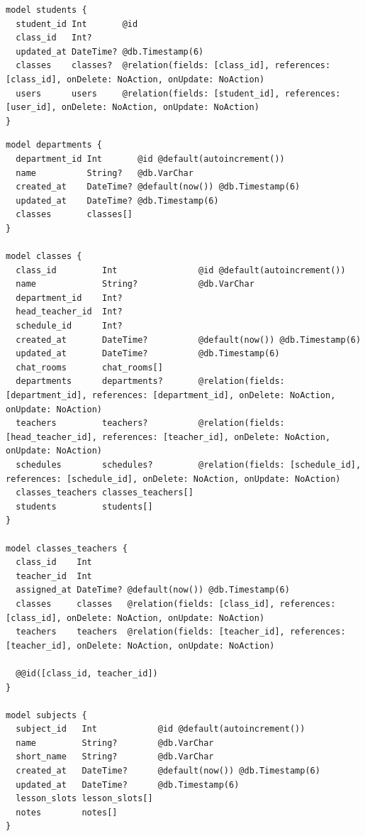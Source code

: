 \begin{listing}[H]
\begin{verbatim}
model students {
  student_id Int       @id
  class_id   Int?
  updated_at DateTime? @db.Timestamp(6)
  classes    classes?  @relation(fields: [class_id], references: [class_id], onDelete: NoAction, onUpdate: NoAction)
  users      users     @relation(fields: [student_id], references: [user_id], onDelete: NoAction, onUpdate: NoAction)
}
\end{verbatim}
\caption{Prisma -- Modell \texttt{users} sowie die spezialisierten Rollen \texttt{teachers} und \texttt{students}}
\label{lst:prisma_users}
\end{listing}

\begin{listing}[H]
\begin{verbatim}
model departments {
  department_id Int       @id @default(autoincrement())
  name          String?   @db.VarChar
  created_at    DateTime? @default(now()) @db.Timestamp(6)
  updated_at    DateTime? @db.Timestamp(6)
  classes       classes[]
}

model classes {
  class_id         Int                @id @default(autoincrement())
  name             String?            @db.VarChar
  department_id    Int?
  head_teacher_id  Int?
  schedule_id      Int?
  created_at       DateTime?          @default(now()) @db.Timestamp(6)
  updated_at       DateTime?          @db.Timestamp(6)
  chat_rooms       chat_rooms[]
  departments      departments?       @relation(fields: [department_id], references: [department_id], onDelete: NoAction, onUpdate: NoAction)
  teachers         teachers?          @relation(fields: [head_teacher_id], references: [teacher_id], onDelete: NoAction, onUpdate: NoAction)
  schedules        schedules?         @relation(fields: [schedule_id], references: [schedule_id], onDelete: NoAction, onUpdate: NoAction)
  classes_teachers classes_teachers[]
  students         students[]
}

model classes_teachers {
  class_id    Int
  teacher_id  Int
  assigned_at DateTime? @default(now()) @db.Timestamp(6)
  classes     classes   @relation(fields: [class_id], references: [class_id], onDelete: NoAction, onUpdate: NoAction)
  teachers    teachers  @relation(fields: [teacher_id], references: [teacher_id], onDelete: NoAction, onUpdate: NoAction)

  @@id([class_id, teacher_id])
}

model subjects {
  subject_id   Int            @id @default(autoincrement())
  name         String?        @db.VarChar
  short_name   String?        @db.VarChar
  created_at   DateTime?      @default(now()) @db.Timestamp(6)
  updated_at   DateTime?      @db.Timestamp(6)
  lesson_slots lesson_slots[]
  notes        notes[]
}


\end{verbatim}
\end{listing}
